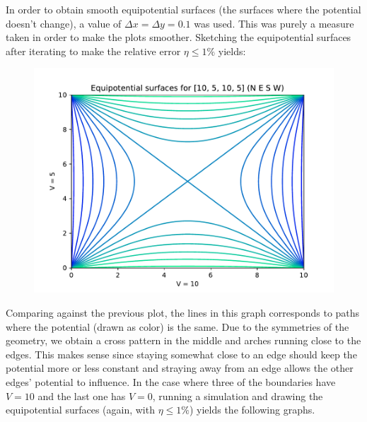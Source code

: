 \documentclass[a4paper,12pt]{article}
\begin{document}
In order to obtain smooth equipotential surfaces (the surfaces where the potential doesn't change), a value of
$\Delta x = \Delta y = 0.1$ was used. This was purely a measure taken in order to make the plots smoother.
Sketching the equipotential surfaces after iterating to make the relative error $\eta \leq 1\%$ yields:

\begin{figure}[!ht]
  \centering
  \includegraphics[scale=0.49]{img/4_1c_equipotential_510510.pdf}
\end{figure}

Comparing against the previous plot, the lines in this graph corresponds to paths where the potential (drawn as color)
is the same. Due to the symmetries of the geometry, we obtain a cross pattern in the middle and arches running close
to the edges. This makes sense since staying somewhat close to an edge should keep the potential more or less constant
and straying away from an edge allows the other edges' potential to influence. In the case where three of the
boundaries have $V = 10$ and the last one has $V = 0$, running a simulation and drawing the equipotential surfaces
(again, with $\eta \leq 1\%$) yields the following graphs.
\end{document}
